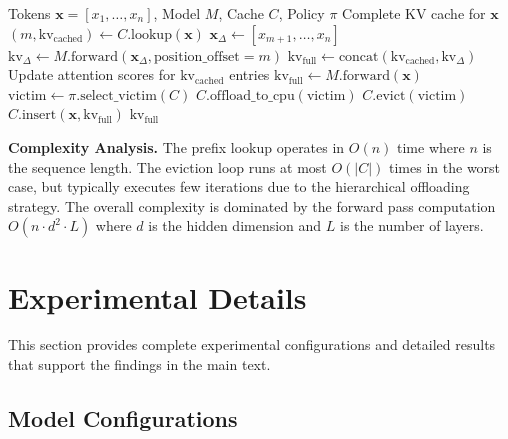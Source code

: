 \documentclass{article}
\begin{document}
\begin{algorithm}[h]
\caption{Incremental KV Computation with Eviction}
\label{alg:incremental_full}
\begin{algorithmic}[1]
\Require Tokens $\mathbf{x} = [x_1, \ldots, x_n]$, Model $M$, Cache $C$, Policy $\pi$
\Ensure Complete KV cache for $\mathbf{x}$
\State $(m, \text{kv}_{\text{cached}}) \gets C.\text{lookup}(\mathbf{x})$ 
 
    \State $\mathbf{x}_\Delta \gets [x_{m+1}, \ldots, x_n]$ 
    \State $\text{kv}_\Delta \gets M.\text{forward}(\mathbf{x}_\Delta, \text{position\_offset}=m)$
    \State $\text{kv}_{\text{full}} \gets \text{concat}(\text{kv}_{\text{cached}}, \text{kv}_\Delta)$
    \State Update attention scores for $\text{kv}_{\text{cached}}$ entries
\Else {}
    \State $\text{kv}_{\text{full}} \gets M.\text{forward}(\mathbf{x})$
\EndIf
{}
    \State $\text{victim} \gets \pi.\text{select\_victim}(C)$ 
        \State $C.\text{offload\_to\_cpu}(\text{victim})$
    \Else
        \State $C.\text{evict}(\text{victim})$
    \EndIf
\EndWhile
\State $C.\text{insert}(\mathbf{x}, \text{kv}_{\text{full}})$
\State \Return $\text{kv}_{\text{full}}$
\end{algorithmic}
\end{algorithm}

\textbf{Complexity Analysis.}
The prefix lookup operates in $O(n)$ time where $n$ is the sequence length.
The eviction loop runs at most $O(|C|)$ times in the worst case, but typically executes few iterations due to the hierarchical offloading strategy.
The overall complexity is dominated by the forward pass computation $O(n \cdot d^2 \cdot L)$ where $d$ is the hidden dimension and $L$ is the number of layers.

\section{Experimental Details}
\label{app:experiments}

This section provides complete experimental configurations and detailed results that support the findings in the main text.

\subsection{Model Configurations}
\end{document}
